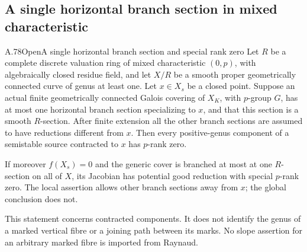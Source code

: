 \subsection{A single horizontal branch section in mixed characteristic}

\begin{statement}{A.78}{Open}{A single horizontal branch section and special rank zero}
Let \(R\) be a complete discrete valuation ring of mixed
characteristic \((0,p)\), with algebraically closed residue field,
and let \(X/R\) be a smooth proper geometrically connected curve
of genus at least one. Let \(x\in X_s\) be a closed point.
Suppose an actual finite geometrically connected Galois covering of \(X_K\), with
\(p\)-group \(G\), has at most one horizontal branch section
specializing to \(x\), and that this section is a smooth
\(R\)-section. After finite extension all the other branch
sections are assumed to have reductions different from \(x\).
Then every positive-genus component of a semistable source
contracted to \(x\) has \(p\)-rank zero.

If moreover \(f(X_s)=0\) and the generic cover is branched
at most at one \(R\)-section on all of \(X\), its
Jacobian has potential good reduction with special
\(p\)-rank zero. The local assertion allows other branch
sections away from \(x\); the global conclusion does not.
\end{statement}

This statement concerns contracted components. It does not
identify the genus of a marked vertical fibre or a joining
path between its marks. No slope assertion for an arbitrary
marked fibre is imported from Raynaud.

